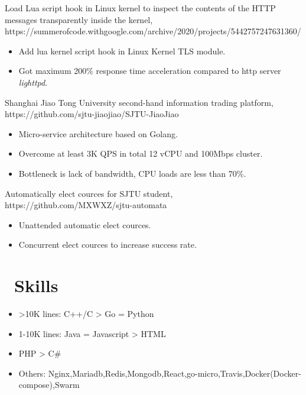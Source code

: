 \documentclass{resume}
\begin{document}
Load Lua script hook in Linux kernel to inspect the contents of the HTTP messages transparently inside the kernel, https://summerofcode.withgoogle.com/archive/2020/projects/5442757247631360/
\begin{itemize}
    \item Add lua kernel script hook in Linux Kernel TLS module.
    \item Got maximum 200\% response time acceleration compared to http server \textit{lighttpd}.
\end{itemize}

Shanghai Jiao Tong University second-hand information trading platform, https://github.com/sjtu-jiaojiao/SJTU-JiaoJiao
\begin{itemize}
    \item Micro-service architecture based on Golang.
    \item Overcome at least 3K QPS in total 12 vCPU and 100Mbps cluster.
    \item Bottleneck is lack of bandwidth, CPU loads are less than 70\%.
\end{itemize}

Automatically elect cources for SJTU student, https://github.com/MXWXZ/sjtu-automata
\begin{itemize}
    \item Unattended automatic elect cources.
    \item Concurrent elect cources to increase success rate.
\end{itemize}


\section{\faCogs\ Skills}
\begin{itemize}[parsep=0.5ex]
    \item >10K lines: C++/C > Go = Python
    \item 1-10K lines: Java = Javascript > HTML
    \item <1K lines: Shell > PHP > C\#
    \item Others: Nginx,Mariadb,Redis,Mongodb,React,go-micro,Travis,Docker(Docker-compose),Swarm
\end{itemize}
\end{document}
